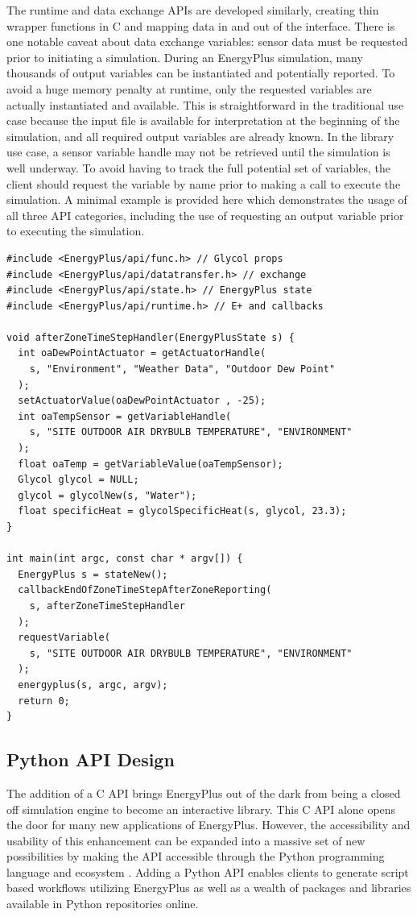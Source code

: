 \documentclass[5p]{elsarticle}
\begin{document}
The runtime and data exchange APIs are developed similarly, creating thin wrapper functions in C and mapping data in and out of the interface.  There is one notable caveat about data exchange variables: sensor data must be requested prior to initiating a simulation.  During an EnergyPlus simulation, many thousands of output variables can be instantiated and potentially reported.  To avoid a huge memory penalty at runtime, only the requested variables are actually instantiated and available.  This is straightforward in the traditional use case because the input file is available for interpretation at the beginning of the simulation, and all required output variables are already known.  In the library use case, a sensor variable handle may not be retrieved until the simulation is well underway.  To avoid having to track the full potential set of variables, the client should request the variable by name prior to making a call to execute the simulation.  A minimal example is provided here which demonstrates the usage of all three API categories, including the use of requesting an output variable prior to executing the simulation.  

\lstset{language=c}
\begin{lstlisting}
#include <EnergyPlus/api/func.h> // Glycol props
#include <EnergyPlus/api/datatransfer.h> // exchange 
#include <EnergyPlus/api/state.h> // EnergyPlus state
#include <EnergyPlus/api/runtime.h> // E+ and callbacks

void afterZoneTimeStepHandler(EnergyPlusState s) {
  int oaDewPointActuator = getActuatorHandle(
    s, "Environment", "Weather Data", "Outdoor Dew Point"
  );
  setActuatorValue(oaDewPointActuator , -25);
  int oaTempSensor = getVariableHandle(
    s, "SITE OUTDOOR AIR DRYBULB TEMPERATURE", "ENVIRONMENT"
  );
  float oaTemp = getVariableValue(oaTempSensor);
  Glycol glycol = NULL;
  glycol = glycolNew(s, "Water");
  float specificHeat = glycolSpecificHeat(s, glycol, 23.3);
}

int main(int argc, const char * argv[]) {
  EnergyPlus s = stateNew();
  callbackEndOfZoneTimeStepAfterZoneReporting(
    s, afterZoneTimeStepHandler
  );
  requestVariable(
    s, "SITE OUTDOOR AIR DRYBULB TEMPERATURE", "ENVIRONMENT"
  );
  energyplus(s, argc, argv);
  return 0;
}
\end{lstlisting}

  \subsection{Python API Design}
The addition of a C API brings EnergyPlus out of the dark from being a closed off simulation engine to become an interactive library.  This C API alone opens the door for many new applications of EnergyPlus. However, the accessibility and usability of this enhancement can be expanded into a massive set of new possibilities by making the API accessible through the Python programming language and ecosystem \cite{Rossum}.  Adding a Python API enables clients to generate script based workflows utilizing EnergyPlus as well as a wealth of packages and libraries available in Python repositories online.
\end{document}
